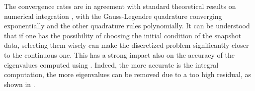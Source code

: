 The convergence rates are in agreement with standard theoretical results on numerical integration \cite{quarteroni_numerical_2007}, with the Gauss-Legendre quadrature converging exponentially and the other quadrature rules polynomially. It can be understood that if one has the possibility of choosing the initial condition of the snapshot data, selecting them wisely can make the discretized problem significantly closer to the continuous one. This has a strong impact also on the accuracy of the eigenvalues computed using . Indeed, the more accurate is the integral computation, the more eigenvalues can be removed due to a too high residual, as shown in .

\begin{figure}[h]
\centering
{}
\end{figure}

